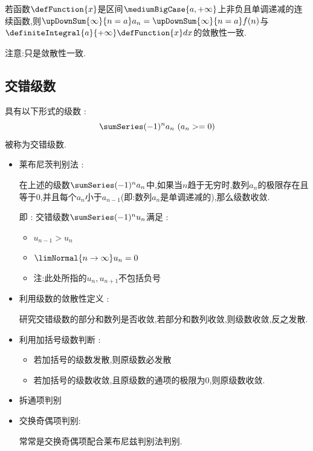 {{{{\begin{itemize}
{            若函数$\defFunction{x}$是区间$\mediumBigCase{a,+\infty}$上非负且单调递减的连续函数,则$\upDownSum{\infty}{n = a} a_n = \upDownSum{\infty}{n = a} f(n)$与$\definiteIntegral{a}{+\infty}\defFunction{x}dx$的敛散性一致.

            注意:只是敛散性一致.
            }
    \end{itemize}
  }%

  \subsection{交错级数}{
    具有以下形式的级数 :
    $$
      \sumSeries (-1)^na_n\ (a_n >= 0)
    $$
    被称为交错级数.

    \begin{itemize}
      \item {
            莱布尼茨判别法 :

            在上述的级数$\sumSeries (-1)^na_n$中,如果当$n$趋于无穷时,数列$a_n$的极限存在且等于$0$,并且每个$a_n$小于$a_{n-1}$(即:数列$a_n$是单调递减的),那么级数收敛.

            即 : 交错级数$\sumSeries(-1)^{n}u_n$满足 :
            \begin{itemize}
              \item $u_{n - 1} > u_n$
              \item $\limNormal{n \to \infty}u_n = 0$
              \item 注:此处所指的$u_n,u_{n + 1}$不包括负号
            \end{itemize}
            }
      \item{
            利用级数的敛散性定义 :

            研究交错级数的部分和数列是否收敛,若部分和数列收敛,则级数收敛,反之发散.
            }
      \item{
            利用加括号级数判断 :

            \begin{itemize}
              \item 若加括号的级数发散,则原级数必发散
              \item 若加括号的级数收敛,且原级数的通项的极限为$0$,则原级数收敛.
            \end{itemize}
            }
      \item 拆通项判别
      \item {
            交换奇偶项判别:

            常常是交换奇偶项配合莱布尼兹判别法判别.
            }
    \end{itemize}
  }%

}}}
